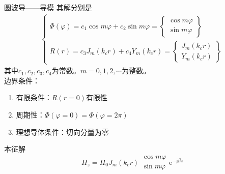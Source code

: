 \begin{frame}{圆波导——导模}
    其解分别是
    \begin{align*}
        \begin{cases}
            \Phi(\varphi)=c_1\cos m\varphi+c_2\sin m\varphi=\left\{\begin{matrix*}\cos m\varphi \\ \sin m\varphi\end{matrix*}\right\} \\
            R(r)=c_3J_m(k_c r)+c_4Y_m(k_c r)=\left\{\begin{matrix*}J_m(k_c r)\\Y_m(k_c r)\end{matrix*}\right\}
        \end{cases}
    \end{align*}
    其中$c_1,c_2,c_3,c_4$为常数。$m=0,1,2,\cdots$为整数。\\
    边界条件：\\
    \begin{enumerate}
        \item 有限条件：$R(r=0)$有限性
        \item 周期性：$\Phi(\varphi=0)=\Phi(\varphi=2\pi)$
        \item 理想导体条件：切向分量为零
    \end{enumerate}
    本征解
    $$H_z=H_0J_m(k_cr)
        \begin{matrix}
            \cos m\varphi \\
            \sin m\varphi
        \end{matrix}
        \mathrm{e}^{-\mathrm{j}\beta z}$$
\end{frame}

